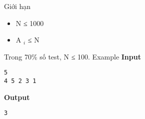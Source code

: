 Giới hạn
\begin{itemize}
	\item N ≤ 1000
	\item A $_ i $ ≤ N
\end{itemize}

Trong 70\% số test, N ≤ 100.
Example
\textbf{Input }
\begin{verbatim}
5
4 5 2 3 1\end{verbatim}

\textbf{Output }
\begin{verbatim}
3\end{verbatim}